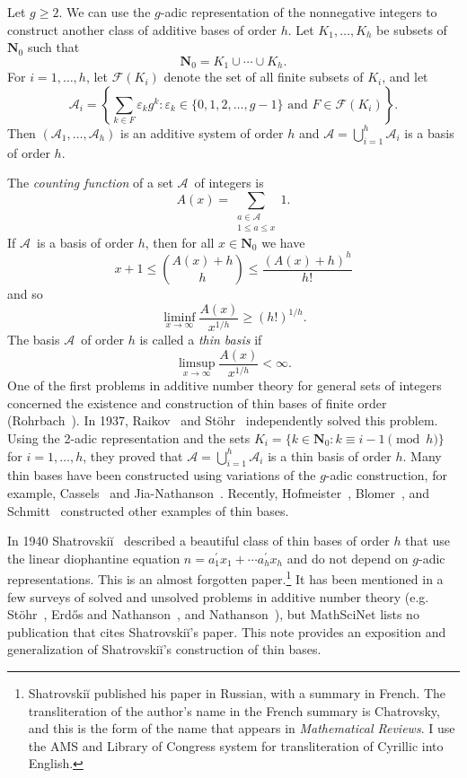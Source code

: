 \documentclass{amsart}
\begin{document}
Let $g \geq 2$.  We can use the $g$-adic representation of the nonnegative integers to construct another class of additive bases of order $h$.  Let  $K_1,\ldots, K_h$ be subsets of ${\ensuremath{ \mathbf N }}_0$ such that 
\[
{\ensuremath{ \mathbf N }}_0 = K_1\cup \cdots \cup K_h.
\]
For $i = 1,\ldots, h$, let ${\ensuremath{ \mathcal F}}(K_i)$ denote the set of all finite subsets of $K_i$, and let 
\[
{\ensuremath{ \mathcal A}}_i = \left\{ 
\sum_{k\in F} \varepsilon_k g^k : \varepsilon_k \in \{ 0,1,2,\ldots, g-1\} \text{ and } F \in {\ensuremath{ \mathcal F}}(K_i)  
\right\}.
\]
Then $({\ensuremath{ \mathcal A}}_1,\ldots, {\ensuremath{ \mathcal A}}_h)$ is  an additive system of order $h$ and ${\ensuremath{ \mathcal A}} = \bigcup_{i=1}^h {\ensuremath{ \mathcal A}}_i$ is a basis of order $h$.  

The \emph{counting function} of a set {\ensuremath{ \mathcal A}}\ of integers is
\[
A(x) = \sum_{\substack{a\in{\ensuremath{ \mathcal A}}\\1 \leq a \leq x}} 1.
\]
If {\ensuremath{ \mathcal A}}\ is a basis of order $h$, then for all $x \in {\ensuremath{ \mathbf N }}_0$ we have
\[
x+1 \leq {A(x)+h \choose h} \leq \frac{ (A(x)+h)^h}{h!}
\]
and so 
\[
\liminf_{x\rightarrow\infty} \frac{A(x)}{x^{1/h}} \geq (h!)^{1/h}.
\]
The basis {\ensuremath{ \mathcal A}}\  of order $h$ is called a \emph{thin basis} if  
\[
\limsup_{x\rightarrow\infty} \frac{A(x)}{x^{1/h}} < \infty.
\]
One of the first problems in additive number theory for general sets of integers concerned the existence and construction of thin bases of finite order (Rohrbach~\cite{rohr37a}).    
In 1937, Raikov~\cite{raik37} and St\" ohr~\cite{stoh37}  independently solved this problem. Using the 2-adic representation and the sets
$K_i = \{ k\in {\ensuremath{ \mathbf N }}_0 : k \equiv i-1 \pmod{h} \}$ for $i=1,\ldots, h$, they proved that ${\ensuremath{ \mathcal A}} = \bigcup_{i=1}^h {\ensuremath{ \mathcal A}}_i$ is a thin basis of order $h$. 
Many thin bases have been constructed using variations of the $g$-adic construction, for example, Cassels~\cite{cass57,grek-hadd-helo-pihk06,nath09xf} and Jia-Nathanson~\cite{nath89b}.  
Recently,  Hofmeister~\cite{hofm01}, Blomer~\cite{blom03}, and Schmitt~\cite{schm06} constructed other examples of thin bases.  

In 1940 Shatrovski\u{i}~\cite{shat40} described a beautiful class of thin bases of order $h$ that use the linear diophantine equation $n = a^{\prime}_1x_1+\cdots a^{\prime}_hx_h$ and do not depend on $g$-adic representations.   This is an almost  forgotten paper.\footnote{Shatrovski\u{i} published his paper in Russian, with a summary in French.  The transliteration of the author's name in the French summary is Chatrovsky, and this is the form of the name that appears in  \emph{Mathematical  Reviews}.  I use the AMS and Library of Congress system for transliteration of Cyrillic into English.}
 It has been mentioned in a few surveys of solved and unsolved problems in additive number theory (e.g. St\" ohr~\cite{stoh55}, Erd\H os and Nathanson~\cite{nath87e}, and Nathanson~\cite{nath89e}), but  MathSciNet lists no publication that cites Shatrovski\u{i}'s paper.
This note provides an exposition and generalization of Shatrovski\u{i}'s construction of thin bases.
\end{document}
